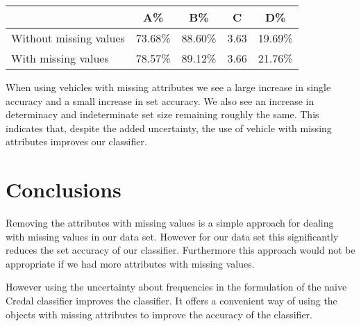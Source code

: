 \begin{center}
\begin{tabular}{l|c c c c}
	                       & A\%     & B\%     & C    & D\%     \\
	\hline
	Without missing values & 73.68\% & 88.60\% & 3.63 & 19.69\% \\
	With missing values    & 78.57\% & 89.12\% & 3.66 & 21.76\% \\
\end{tabular}
\end{center}

When using vehicles with missing attributes we see a large increase in single accuracy and a small increase in set accuracy. We also see an increase in determinacy and indeterminate set size remaining roughly the same.
This indicates that, despite the added uncertainty, the use of vehicle with missing attributes improves our classifier.

\section{Conclusions}

Removing the attributes with missing values is a simple approach for dealing with missing values in our data set.
However for our data set this significantly reduces the set accuracy of our classifier.
Furthermore this approach would not be appropriate if we had more attributes with missing values.

However using the uncertainty about frequencies in the formulation of the naive Credal classifier improves the classifier.
It offers a convenient way of using the objects with missing attributes to improve the accuracy of the classifier.

